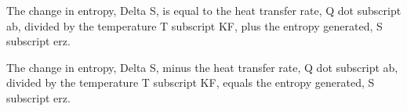 The change in entropy, Delta S, is equal to the heat transfer rate, Q dot subscript ab, divided by the temperature T subscript KF, plus the entropy generated, S subscript erz.

The change in entropy, Delta S, minus the heat transfer rate, Q dot subscript ab, divided by the temperature T subscript KF, equals the entropy generated, S subscript erz.